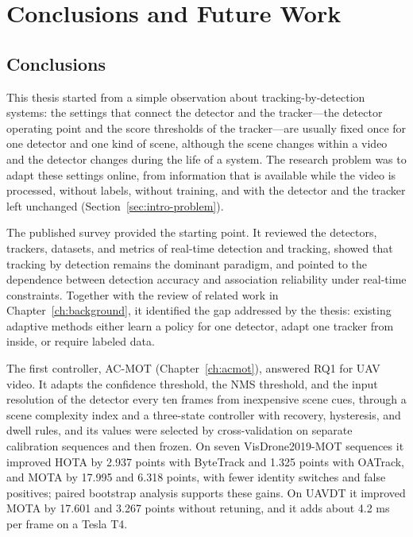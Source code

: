 \chapter{Conclusions and Future Work}\label{ch:conclusions}

\section{Conclusions}\label{sec:conc-conclusion}
This thesis started from a simple observation about tracking-by-detection systems: the settings that connect the detector and the tracker---the detector operating point and the score thresholds of the tracker---are usually fixed once for one detector and one kind of scene, although the scene changes within a video and the detector changes during the life of a system. The research problem was to adapt these settings online, from information that is available while the video is processed, without labels, without training, and with the detector and the tracker left unchanged (Section~\ref{sec:intro-problem}).

The published survey \cite{ismail2026realtime} provided the starting point. It reviewed the detectors, trackers, datasets, and metrics of real-time detection and tracking, showed that tracking by detection remains the dominant paradigm, and pointed to the dependence between detection accuracy and association reliability under real-time constraints. Together with the review of related work in Chapter~\ref{ch:background}, it identified the gap addressed by the thesis: existing adaptive methods either learn a policy for one detector, adapt one tracker from inside, or require labeled data.

The first controller, AC-MOT (Chapter~\ref{ch:acmot}), answered RQ1 for UAV video. It adapts the confidence threshold, the NMS threshold, and the input resolution of the detector every ten frames from inexpensive scene cues, through a scene complexity index and a three-state controller with recovery, hysteresis, and dwell rules, and its values were selected by cross-validation on separate calibration sequences and then frozen. On seven VisDrone2019-MOT sequences it improved HOTA by 2.937 points with ByteTrack and 1.325 points with OATrack, and MOTA by 17.995 and 6.318 points, with fewer identity switches and false positives; paired bootstrap analysis supports these gains. On UAVDT it improved MOTA by 17.601 and 3.267 points without retuning, and it adds about 4.2 ms per frame on a Tesla T4.

